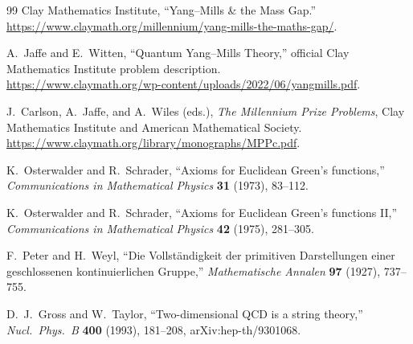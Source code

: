 \documentclass[11pt]{article}
\numberwithin{equation}{section}
\theoremstyle{remark}
\begin{document}
\begin{thebibliography}{99}
Clay Mathematics Institute,
``Yang--Mills \& the Mass Gap.''\\
\url{https://www.claymath.org/millennium/yang-mills-the-maths-gap/}.

A.~Jaffe and E.~Witten,
``Quantum Yang--Mills Theory,''
official Clay Mathematics Institute problem description.\\
\url{https://www.claymath.org/wp-content/uploads/2022/06/yangmills.pdf}.

J.~Carlson, A.~Jaffe, and A.~Wiles (eds.),
\emph{The Millennium Prize Problems},
Clay Mathematics Institute and American Mathematical Society.\\
\url{https://www.claymath.org/library/monographs/MPPc.pdf}.

K.~Osterwalder and R.~Schrader,
``Axioms for Euclidean Green's functions,''
\emph{Communications in Mathematical Physics} \textbf{31} (1973), 83--112.

K.~Osterwalder and R.~Schrader,
``Axioms for Euclidean Green's functions II,''
\emph{Communications in Mathematical Physics} \textbf{42} (1975), 281--305.

F.~Peter and H.~Weyl,
``Die Vollst\"andigkeit der primitiven Darstellungen einer geschlossenen kontinuierlichen Gruppe,''
\emph{Mathematische Annalen} \textbf{97} (1927), 737--755.

D.~J.~Gross and W.~Taylor,
``Two-dimensional QCD is a string theory,''
\emph{Nucl.\ Phys.\ B} \textbf{400} (1993), 181--208,
arXiv:hep-th/9301068.

\end{thebibliography}
\end{document}
